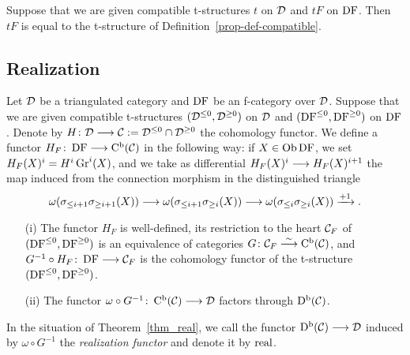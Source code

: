 \begin{proposition}
\label{prop-compatible-uniq}
\leanok
{}
Suppose that we are given compatible t-structures $t$ on $\mathcal{D}$ and $tF$ on $\operatorname{DF}$. Then $tF$ is equal to the
t-structure of Definition~\ref{prop-def-compatible}.

\end{proposition}


\subsection{Realization}

\begin{theorem}
Let $\mathcal{D}$ be a triangulated category and $\operatorname{DF}$ be an f-category over $\mathcal{D}$. Suppose that we are given compatible
t-structures $(\mathcal{D}^{\leq 0},\mathcal{D}^{\geq 0})$ on $\mathcal{D}$ and $(\operatorname{DF}^{\leq 0},\operatorname{DF}^{\geq 0})$ on $\operatorname{DF}$. Denote by
$H\colon \mathcal{D}\longrightarrow\mathcal{C}:=\mathcal{D}^{\leq 0}\cap\mathcal{D}^{\geq 0}$ the cohomology functor. We define a functor
$H_F\colon \operatorname{DF}\longrightarrow\operatorname{\mathrm{C}^b}(\mathcal{C})$ in the following way: if $X\in\operatorname{\mathrm{Ob}}\operatorname{DF}$, we set $H_F(X)^i=H^i\operatorname{Gr}^i(X)$, and we
take as differential $H_F(X)^i\longrightarrow H_F(X)^{i+1}$ the map induced from the connection morphism in the 
distinguished triangle
\[\omega(\sigma_{\leq i+1}\sigma_{\geq i+1}(X))\longrightarrow\omega(\sigma_{\leq i+1}\sigma_{\geq i}(X))\longrightarrow
\omega(\sigma_{\leq i}\sigma_{\geq i}(X))\xrightarrow{+1}.\]

\begin{itemize}
\item[(i)] The functor $H_F$ is well-defined, its restriction to the heart $\mathcal{C}_F$ of $(\operatorname{DF}^{\leq 0},\operatorname{DF}^{\geq 0})$ is an equivalence
of categories $G\colon \mathcal{C}_F\stackrel{\sim}{\longrightarrow}\operatorname{\mathrm{C}^b}(\mathcal{C})$, and $G^{-1}\circ H_F\colon \operatorname{DF}\longrightarrow\mathcal{C}_F$ is the cohomology functor of the t-structure
$(\operatorname{DF}^{\leq 0},\operatorname{DF}^{\geq 0})$.

\item[(ii)] The functor $\omega\circ G^{-1}\colon \operatorname{\mathrm{C}^b}(\mathcal{C})\longrightarrow\mathcal{D}$ factors through $\operatorname{\mathrm{D}^b}(\mathcal{C})$.

\end{itemize}
\label{thm_real}
\end{theorem}

\begin{definition}
In the situation of Theorem~\ref{thm_real}, we call the functor $\operatorname{\mathrm{D}^b}(\mathcal{C})\longrightarrow\mathcal{D}$ induced by $\omega\circ G^{-1}$ the
\emph{realization functor} and denote it by $\operatorname{real}$.

\label{def_real}
\end{definition}
